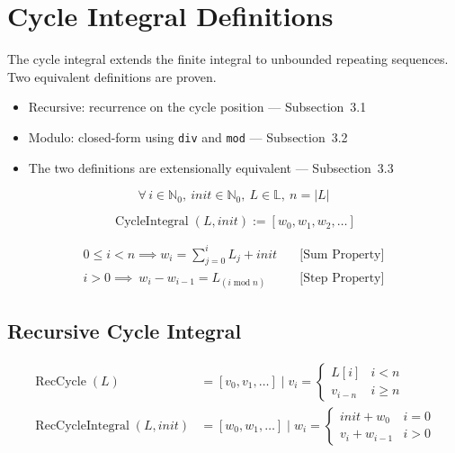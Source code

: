 \section{Cycle Integral Definitions}

The cycle integral extends the finite integral to unbounded repeating
sequences. Two equivalent definitions are proven.

\begin{itemize}
  \item Recursive: recurrence on the cycle position --- Subsection~3.1
  \item Modulo: closed-form using \texttt{div} and \texttt{mod} ---
    Subsection~3.2
  \item The two definitions are extensionally equivalent --- Subsection~3.3
\end{itemize}

\begin{equation*}
\forall\, i \in \mathbb{N}_0,\ init \in \mathbb{N}_0,\ L \in \mathbb{L},\ n = |L|
\end{equation*}

\begin{equation*}
\operatorname{CycleIntegral}(L, init) := [w_0, w_1, w_2, \ldots]
\end{equation*}

\begin{equation*}
\begin{aligned}
0 \leq i < n \implies w_i = \sum_{j=0}^i L_j + init \quad &\text{[Sum Property]} \\
i > 0 \implies  \ w_i - w_{i-1} = L_{(i \operatorname{mod} n)}
\quad &\text{[Step Property]}
\end{aligned}
\end{equation*}

\subsection{Recursive Cycle Integral}

\begin{equation*}
\begin{aligned}
\operatorname{RecCycle}(L) &= [v_0, v_1, \dots] \mid v_i =
\begin{cases}
  L[i] & i < n \\
  v_{i - n} & i \geq n
\end{cases} \\
\operatorname{RecCycleIntegral}(L, init) &= [w_0, w_1, \dots] \mid w_i =
\begin{cases}
  init + w_0 & i = 0 \\
  v_i + w_{i - 1} & i > 0
\end{cases}
\end{aligned}
\end{equation*}

